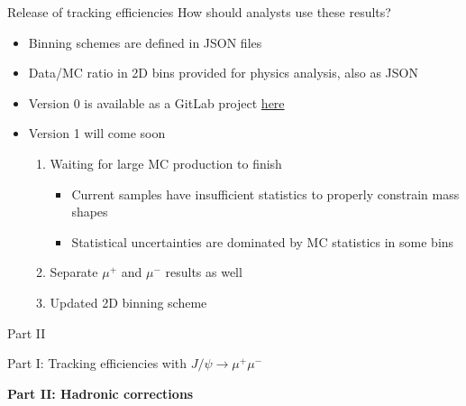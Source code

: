 \documentclass[xcolor={dvipsnames}]{beamer}
\begin{document}
\begin{frame}{Release of tracking efficiencies}
  \vspace{0.0cm}
  {\large How should analysts use these results?}
  \vspace{0.2cm}
  \begin{itemize}
    \setlength\itemsep{1.0em}
    \item{Binning schemes are defined in JSON files}
    \item{Data/MC ratio in 2D bins provided for physics analysis, also as JSON}
    \item{Version 0 is available as a GitLab project \href{https://gitlab.cern.ch/lhcb-rta/tracking-efficiencies-run-3}{here}}
    \item{Version 1 will come soon}
    \begin{enumerate}
      \item{Waiting for large MC production to finish}
      \begin{itemize}
        \item[-]{Current samples have insufficient statistics to properly constrain mass shapes}
        \item[-]{Statistical uncertainties are dominated by MC statistics in some bins}
      \end{itemize}
      \item{Separate $\mu^+$ and $\mu^-$ results as well}
      \item{Updated 2D binning scheme}
    \end{enumerate}
  \end{itemize}
\end{frame}

\begin{frame}{Part II}
  \vspace{0.0cm}
  \begin{center}
    {\Large Part I: Tracking efficiencies with $J/\psi\to\mu^+\mu^-$}
  \end{center}
  \begin{center}
    {\Large \textbf{Part II: Hadronic corrections}}
  \end{center}
\end{frame}
\end{document}
